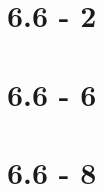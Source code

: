 \documentclass[12pt]{article}
\begin{document}
\newpage

\section*{6.6 - 2}


\newpage

\section*{6.6 - 6}


\newpage

\section*{6.6 - 8}
\end{document}
